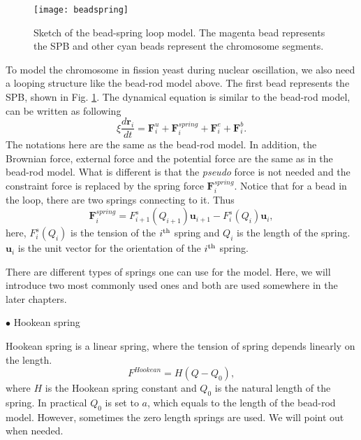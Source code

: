 \begin{figure}[htpb]
    \centering
    \texttt{[image: beadspring]}
    \caption{Sketch of the bead-spring loop model. The magenta bead represents the SPB and other cyan beads represent the chromosome segments.}
    \label{fig:beadspring}
\end{figure}

To model the chromosome in fission yeast during nuclear oscillation, we also need a looping structure like the bead-rod model above. The first bead represents the SPB, shown in Fig. \ref{fig:beadspring}. The dynamical equation is similar to the bead-rod model, can be written as following
\begin{equation}
    \label{eq:beadspringEq}
    \xi \frac{d \mathbf{r}_i}{d t} = \mathbf{F}_i^{u} + \mathbf{F}_i^{spring} + \mathbf{F}_i^{e} + \mathbf{F}_i^{b}.
\end{equation}
The notations here are the same as the bead-rod model. In addition, the Brownian force, external force and the potential force are the same as in the bead-rod model. What is different is that the \emph{pseudo} force is not needed and the constraint force is replaced by the spring force $\mathbf{F}_i^{spring}$. Notice that for a bead in the loop, there are two springs connecting to it. Thus
\begin{equation}
    \label{eq:springForce}
    \mathbf{F}_i^{spring} = F_{i+1}^s(Q_{i+1})\mathbf{u}_{i+1} - F_{i}^s(Q_{i})\mathbf{u}_{i},
\end{equation}
here, $F_i^s(Q_i)$ is the tension of the $i^{\rm{th}}$ spring and $Q_i$ is the length of the spring. $\mathbf{u}_i$ is the unit vector for the orientation of the $i^{\rm{th}}$ spring.

There are different types of springs one can use for the model. Here, we will introduce two most commonly used ones and both are used somewhere in the later chapters.

$\bullet$ Hookean spring

Hookean spring is a linear spring, where the tension of spring depends linearly on the length. 
\begin{equation}
    \label{eq:hookeanSpring}
    F^{Hookean} = H (Q-Q_0),
\end{equation}
where $H$ is the Hookean spring constant and $Q_0$ is the natural length of the spring. In practical $Q_0$ is set to $a$, which equals to the length of the bead-rod model. However, sometimes the zero length springs are used. We will point out when needed. 

